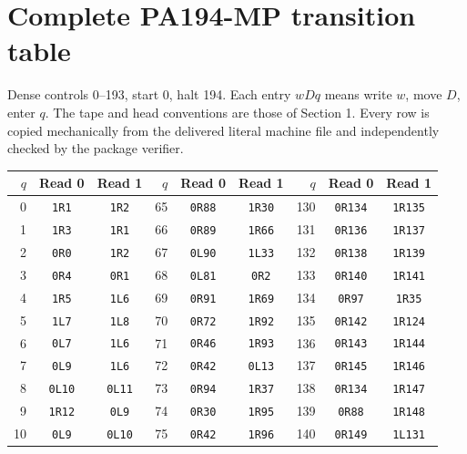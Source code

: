 \documentclass[10pt,a4paper]{article}
\renewcommand{\arraystretch}{1.15}
\begin{document}
\clearpage\section{Complete PA194-MP transition table}
Dense controls 0--193, start 0, halt 194. Each entry $wDq$ means write $w$, move $D$, enter $q$. The tape and head conventions are those of Section 1. Every row is copied mechanically from the delivered literal machine file and independently checked by the package verifier.
\begin{center}\fontsize{8.2}{9.0}\selectfont\renewcommand{\arraystretch}{0.96}\setlength{\tabcolsep}{7pt}\begin{tabular}{rcc@{\hspace{14pt}}rcc@{\hspace{14pt}}rcc}\toprule
$q$ & Read 0 & Read 1 & $q$ & Read 0 & Read 1 & $q$ & Read 0 & Read 1 \\\midrule
0 & \texttt{1R1} & \texttt{1R2} & 65 & \texttt{0R88} & \texttt{1R30} & 130 & \texttt{0R134} & \texttt{1R135} \\
1 & \texttt{1R3} & \texttt{1R1} & 66 & \texttt{0R89} & \texttt{1R66} & 131 & \texttt{0R136} & \texttt{1R137} \\
2 & \texttt{0R0} & \texttt{1R2} & 67 & \texttt{0L90} & \texttt{1L33} & 132 & \texttt{0R138} & \texttt{1R139} \\
3 & \texttt{0R4} & \texttt{0R1} & 68 & \texttt{0L81} & \texttt{0R2} & 133 & \texttt{0R140} & \texttt{1R141} \\
4 & \texttt{1R5} & \texttt{1L6} & 69 & \texttt{0R91} & \texttt{1R69} & 134 & \texttt{0R97} & \texttt{1R35} \\
5 & \texttt{1L7} & \texttt{1L8} & 70 & \texttt{0R72} & \texttt{1R92} & 135 & \texttt{0R142} & \texttt{1R124} \\
6 & \texttt{0L7} & \texttt{1L6} & 71 & \texttt{0R46} & \texttt{1R93} & 136 & \texttt{0R143} & \texttt{1R144} \\
7 & \texttt{0L9} & \texttt{1L6} & 72 & \texttt{0R42} & \texttt{0L13} & 137 & \texttt{0R145} & \texttt{1R146} \\
8 & \texttt{0L10} & \texttt{0L11} & 73 & \texttt{0R94} & \texttt{1R37} & 138 & \texttt{0R134} & \texttt{1R147} \\
9 & \texttt{1R12} & \texttt{0L9} & 74 & \texttt{0R30} & \texttt{1R95} & 139 & \texttt{0R88} & \texttt{1R148} \\
10 & \texttt{0L9} & \texttt{0L10} & 75 & \texttt{0R42} & \texttt{1R96} & 140 & \texttt{0R149} & \texttt{1L131} \\

\end{tabular}
\end{center}
\end{document}
